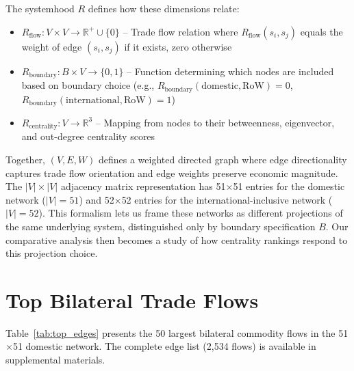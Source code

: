 \documentclass[12pt,oneside]{book}
\begin{document}
The systemhood $R$ defines how these dimensions relate:
\begin{itemize}
  \item $R_{\text{flow}}: V \times V \to \mathbb{R}^+ \cup \{0\}$ -- Trade flow relation where $R_{\text{flow}}(s_i, s_j)$ equals the weight of edge $(s_i, s_j)$ if it exists, zero otherwise
  \item $R_{\text{boundary}}: B \times V \to \{0, 1\}$ -- Function determining which nodes are included based on boundary choice (e.g., $R_{\text{boundary}}(\text{domestic}, \text{RoW}) = 0$, $R_{\text{boundary}}(\text{international}, \text{RoW}) = 1$)
  \item $R_{\text{centrality}}: V \to \mathbb{R}^3$ -- Mapping from nodes to their betweenness, eigenvector, and out-degree centrality scores
\end{itemize}

Together, $(V, E, W)$ defines a weighted directed graph where edge directionality captures trade flow orientation and edge weights preserve economic magnitude. The $|V| \times |V|$ adjacency matrix representation has 51$\times$51 entries for the domestic network ($|V|=51$) and 52$\times$52 entries for the international-inclusive network ($|V|=52$). This formalism lets us frame these networks as different projections of the same underlying system, distinguished only by boundary specification $B$. Our comparative analysis then becomes a study of how centrality rankings respond to this projection choice.



\chapter{Top Bilateral Trade Flows}
\label{appendix:edge_list}

Table~\ref{tab:top_edges} presents the 50 largest bilateral commodity flows in the 51$\times$51 domestic network. The complete edge list (2,534 flows) is available in supplemental materials.
\end{document}
